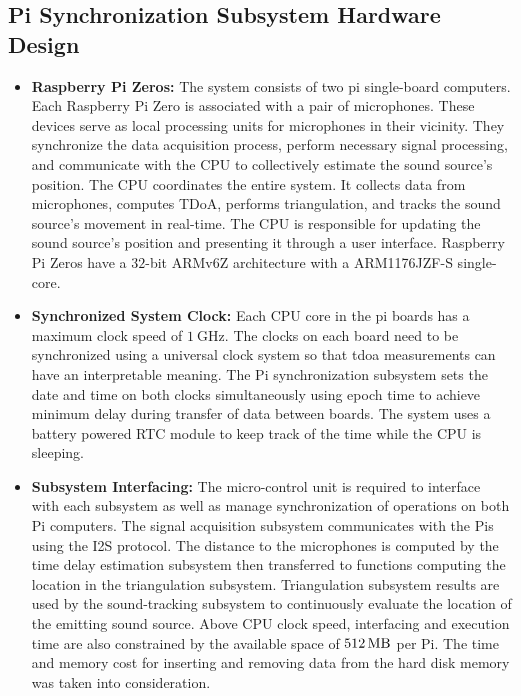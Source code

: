 \documentclass[a4paper,11pt]{article}
\begin{document}
\subsection{Pi Synchronization Subsystem Hardware Design}
\begin{itemize}
	\item
	\textbf{Raspberry Pi Zeros:} The system consists of two \gls{pi} single-board computers. Each Raspberry Pi Zero is associated with a pair of microphones. These devices serve as local processing units for microphones in their vicinity. They synchronize the data acquisition process, perform necessary signal processing, and communicate with the CPU to collectively estimate the sound source's position. The CPU coordinates the entire system. It collects data from microphones, computes TDoA, performs triangulation, and tracks the sound source's movement in real-time. The CPU is responsible for updating the sound source's position and presenting it through a user interface. Raspberry Pi Zeros have a $32$-bit ARMv6Z architecture with a ARM1176JZF-S single-core.
	\item 
	\textbf{Synchronized System Clock:} Each CPU core in the \gls{pi} boards has a maximum clock speed of $\SI{1}{\giga\hertz}$. The clocks on each board need to be synchronized using a universal clock system so that \gls{tdoa} measurements can have an interpretable meaning. The Pi synchronization subsystem sets the date and time on both clocks simultaneously using epoch time to achieve minimum delay during transfer of data between boards. The system uses a battery powered RTC module to keep track of the time while the CPU is sleeping. 
	\item
	\textbf{Subsystem Interfacing:} The micro-control unit is required to interface with each subsystem as well as manage synchronization of operations on both Pi computers. The signal acquisition subsystem communicates with the Pis using the I2S protocol. The distance to the microphones is computed by the time delay estimation subsystem then transferred to functions computing the location in the triangulation subsystem. Triangulation subsystem results are used by the sound-tracking subsystem to continuously evaluate the location of the emitting sound source. Above CPU clock speed, interfacing and execution time are also constrained by the available space of $\SI{512}{\mega\byte}$ per Pi. The time and memory cost for inserting and removing data from the hard disk memory was taken into consideration. 
\end{itemize}
\end{document}
